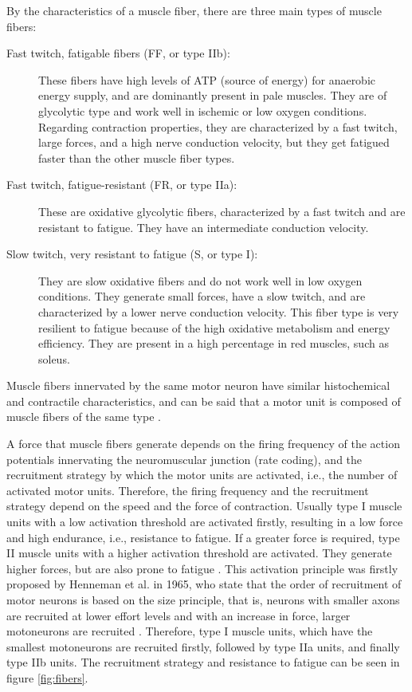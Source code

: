 By the characteristics of a muscle fiber, there are three main types of muscle fibers:
\begin{description}
\item[Fast twitch, fatigable fibers (FF, or type IIb):] These fibers have high levels of ATP (source of energy) for anaerobic energy supply, and are dominantly present in pale muscles. They are of glycolytic type and work well in ischemic or low oxygen conditions. Regarding contraction properties, they are characterized by a fast twitch, large forces, and a high nerve conduction velocity, but they get fatigued faster than the other muscle fiber types. 

\item[Fast twitch, fatigue-resistant (FR, or type IIa):] These are oxidative glycolytic fibers, characterized by a fast twitch and are resistant to fatigue. They have an intermediate conduction velocity. 

\item[Slow twitch, very resistant to fatigue (S, or type I):] They are slow oxidative fibers and do not work well in low oxygen conditions. They generate small forces, have a slow twitch, and are characterized by a lower nerve conduction velocity. This fiber type is very resilient to fatigue because of the high oxidative metabolism and energy efficiency. They are present in a high percentage in red muscles, such as soleus.
\end{description}

Muscle fibers innervated by the same motor neuron have similar histochemical and contractile characteristics, and can be said that a motor unit is composed of muscle fibers of the same type \citep{Merletti-book}.


A force that muscle fibers generate depends on the firing frequency of the action potentials innervating the neuromuscular junction (rate coding), and the recruitment strategy by which the motor units are activated, i.e., the number of activated motor units. Therefore, the firing frequency and the recruitment strategy depend on the speed and the force of contraction. Usually type I muscle units with a low activation threshold are activated firstly, resulting in a low force and high endurance, i.e., resistance to fatigue. If a greater force is required, type II muscle units with a higher activation threshold are activated. They generate higher forces, but are also prone to fatigue \citep{Freund1975, Merletti-book}. This activation principle was firstly proposed by Henneman et al. in 1965, who state that the order of recruitment of motor neurons is based on the size principle, that is, neurons with smaller axons are recruited at lower effort levels and with an increase in force, larger motoneurons are recruited \citep{Henneman1965}. Therefore, type I muscle units, which have the smallest motoneurons are recruited firstly, followed by type IIa units, and finally type IIb units. The recruitment strategy and resistance to fatigue can be seen in figure \ref{fig:fibers}. 

